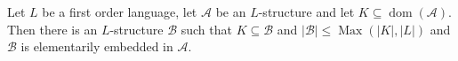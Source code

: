 \documentclass[12pt]{article}
\begin{document}
Let $L$ be a first order language, let $\mathcal{A}$ be an $L$-structure and let $K\subseteq\operatorname{dom}(\mathcal{A})$.  Then there is an $L$-structure $\mathcal{B}$ such that $K\subseteq\mathcal{B}$ and $|\mathcal{B}|\leq\operatorname{Max}(|K|,|L|)$ and $\mathcal{B}$ is elementarily embedded in $\mathcal{A}$.
\end{document}
